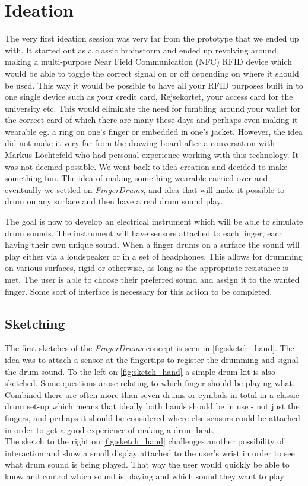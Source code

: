 \chapter{Ideation}
\label{Ideation}
The very first ideation session was very far from the prototype that we ended up with. It started out as a classic brainstorm and ended up revolving around making a multi-purpose Near Field Communication (NFC) RFID device which would be able to toggle the correct signal on or off depending on where it should be used. This way it would be possible to have all your RFID purposes built in to one single device such as your credit card, Rejsekortet, your access card for the university etc. This would eliminate the need for fumbling around your wallet for the correct card of which there are many these days and perhaps even making it wearable eg. a ring on one's finger or embedded in one's jacket. However, the idea did not make it very far from the drawing board after a conversation with Markus Löchtefeld who had personal experience working with this technology. It was not deemed possible. We went back to idea creation and decided to make something fun. The idea of making something wearable carried over and eventually we settled on \textit{FingerDrums}, and idea that will make it possible to drum on any surface and then have a real drum sound play. 

The goal is now to develop an electrical instrument which will be able to simulate drum sounds. The instrument will have sensors attached to each finger, each having their own unique sound. When a finger drums on a surface the sound will play either via a loudspeaker or in a set of headphones. This allows for drumming on various surfaces, rigid or otherwise, as long as the appropriate resistance is met. The user is able to choose their preferred sound and assign it to the wanted finger. Some sort of interface is necessary for this action to be completed.




\section{Sketching}
The first sketches of the \textit{FingerDrums} concept is seen in \autoref{fig:sketch_hand}. The idea was to attach a sensor at the fingertips to register the drumming and signal the drum sound. To the left on \autoref{fig:sketch_hand} a simple drum kit is also  sketched. Some questions arose relating to which finger should be playing what. Combined there are often more than seven drums or cymbals in total in a classic drum set-up which means that ideally both hands should be in use - not just the fingers, and perhaps it should be considered where else sensors could be attached in order to get a good experience of making a drum beat.\\
The sketch to the right on \autoref{fig:sketch_hand} challenges another possibility of interaction and show a small display attached to the user's wrist in order to see what drum sound is being played. That way the user would quickly be able to know and control which sound is playing and which sound they want to play

